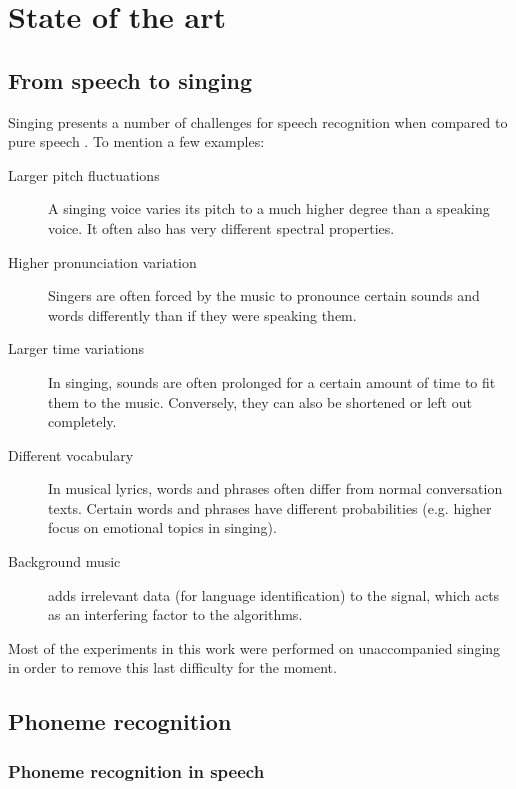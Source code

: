 \chapter{State of the art}	\label{chap:sota}
\section{From speech to singing}
Singing presents a number of challenges for speech recognition when compared to pure speech \cite{goto_alignment}. To mention a few examples:
\begin{description}
 \item[Larger pitch fluctuations] A singing voice varies its pitch to a much higher degree than a speaking voice. It often also has very different spectral properties.
 \item[Higher pronunciation variation] Singers are often forced by the music to pronounce certain sounds and words differently than if they were speaking them.
 \item[Larger time variations] In singing, sounds are often prolonged for a certain amount of time to fit them to the music. Conversely, they can also be shortened or left out completely.
 \item[Different vocabulary] In musical lyrics, words and phrases often differ from normal conversation texts. Certain words and phrases have different probabilities (e.g. higher focus on emotional topics in singing).
 \item[Background music] adds irrelevant data (for language identification) to the signal, which acts as an interfering factor to the algorithms. 
 \end{description}
Most of the experiments in this work were performed on unaccompanied singing in order to remove this last difficulty for the moment.

\section{Phoneme recognition}
\subsection{Phoneme recognition in speech}
